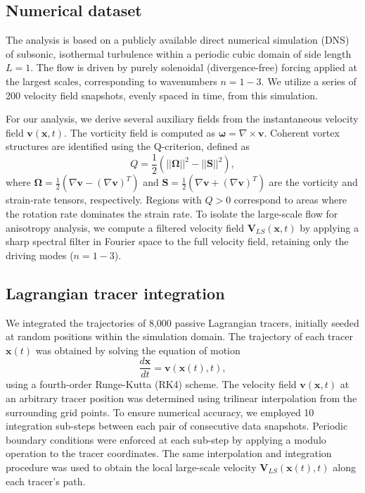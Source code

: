 \documentclass[]{article}
\begin{document}
\subsection{Numerical dataset}
The analysis is based on a publicly available direct numerical simulation (DNS) of subsonic, isothermal turbulence within a periodic cubic domain of side length $L=1$. The flow is driven by purely solenoidal (divergence-free) forcing applied at the largest scales, corresponding to wavenumbers $n=1-3$. We utilize a series of 200 velocity field snapshots, evenly spaced in time, from this simulation.

For our analysis, we derive several auxiliary fields from the instantaneous velocity field $\mathbf{v}(\mathbf{x}, t)$. The vorticity field is computed as $\boldsymbol{\omega} = \nabla \times \mathbf{v}$. Coherent vortex structures are identified using the Q-criterion, defined as
\begin{equation}
    Q = \frac{1}{2} \left( ||\boldsymbol{\Omega}||^2 - ||\mathbf{S}||^2 \right),
\end{equation}
where $\boldsymbol{\Omega} = \frac{1}{2}(\nabla\mathbf{v} - (\nabla\mathbf{v})^T)$ and $\mathbf{S} = \frac{1}{2}(\nabla\mathbf{v} + (\nabla\mathbf{v})^T)$ are the vorticity and strain-rate tensors, respectively. Regions with $Q > 0$ correspond to areas where the rotation rate dominates the strain rate. To isolate the large-scale flow for anisotropy analysis, we compute a filtered velocity field $\mathbf{V}_{LS}(\mathbf{x}, t)$ by applying a sharp spectral filter in Fourier space to the full velocity field, retaining only the driving modes ($n=1-3$).

\subsection{Lagrangian tracer integration}
We integrated the trajectories of 8,000 passive Lagrangian tracers, initially seeded at random positions within the simulation domain. The trajectory of each tracer $\mathbf{x}(t)$ was obtained by solving the equation of motion
\begin{equation}
    \frac{d\mathbf{x}}{dt} = \mathbf{v}(\mathbf{x}(t), t),
\end{equation}
using a fourth-order Runge-Kutta (RK4) scheme. The velocity field $\mathbf{v}(\mathbf{x}, t)$ at an arbitrary tracer position was determined using trilinear interpolation from the surrounding grid points. To ensure numerical accuracy, we employed 10 integration sub-steps between each pair of consecutive data snapshots. Periodic boundary conditions were enforced at each sub-step by applying a modulo operation to the tracer coordinates. The same interpolation and integration procedure was used to obtain the local large-scale velocity $\mathbf{V}_{LS}(\mathbf{x}(t), t)$ along each tracer's path.
\end{document}
